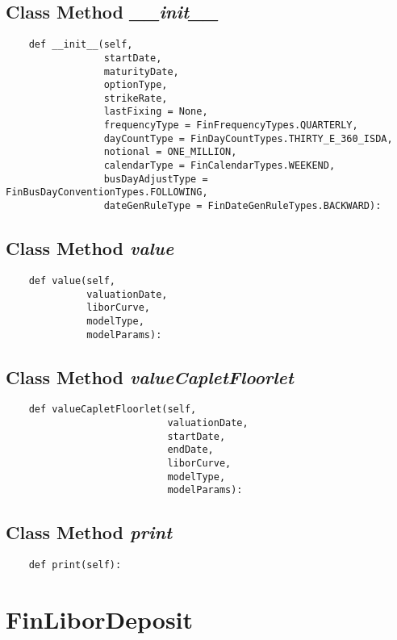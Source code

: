 \documentclass[twoside,11pt]{book}
\begin{document}
\subsection{Class Method {\it \_\_init\_\_}}


\begin{lstlisting}
    def __init__(self, 
                 startDate,
                 maturityDate,
                 optionType,
                 strikeRate,
                 lastFixing = None,
                 frequencyType = FinFrequencyTypes.QUARTERLY,
                 dayCountType = FinDayCountTypes.THIRTY_E_360_ISDA,
                 notional = ONE_MILLION, 
                 calendarType = FinCalendarTypes.WEEKEND,
                 busDayAdjustType = FinBusDayConventionTypes.FOLLOWING,
                 dateGenRuleType = FinDateGenRuleTypes.BACKWARD):
\end{lstlisting}

\subsection{Class Method {\it value}}


\begin{lstlisting}
    def value(self, 
              valuationDate,
              liborCurve, 
              modelType, 
              modelParams):
\end{lstlisting}

\subsection{Class Method {\it valueCapletFloorlet}}


\begin{lstlisting}
    def valueCapletFloorlet(self,
                            valuationDate,
                            startDate, 
                            endDate, 
                            liborCurve, 
                            modelType, 
                            modelParams):
\end{lstlisting}

\subsection{Class Method {\it print}}


\begin{lstlisting}
    def print(self):
\end{lstlisting}

\newpage
\section{FinLiborDeposit}
\end{document}
